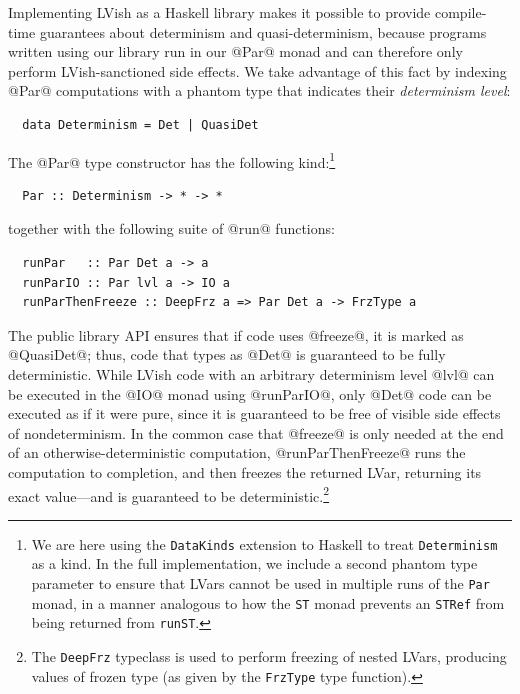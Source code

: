 Implementing LVish as a Haskell library makes it possible to provide
compile-time guarantees about determinism and quasi-determinism,
because programs written using our library run in our @Par@ monad and
can therefore only perform LVish-sanctioned side effects.
We take advantage of
this fact by indexing @Par@ computations with a phantom type
that indicates their \emph{determinism level}:
\begin{lstlisting}
  data Determinism = Det | QuasiDet
\end{lstlisting}
The @Par@ type constructor has the following kind:\footnote{We are here using
  the {\tt DataKinds} extension to Haskell to treat {\tt Determinism} as a
  kind.  In the full implementation, we include a second phantom type parameter to ensure that LVars
  cannot be used in multiple runs of the {\tt Par} monad, in a manner analogous to how the {\tt ST} monad prevents an {\tt STRef} from being returned from {\tt runST}.}
\begin{lstlisting}
  Par :: Determinism -> * -> *
\end{lstlisting}
together with the following suite of @run@ functions:
\begin{lstlisting}
  runPar   :: Par Det a -> a
  runParIO :: Par lvl a -> IO a
  runParThenFreeze :: DeepFrz a => Par Det a -> FrzType a
\end{lstlisting}
The public library API ensures that if code uses @freeze@, it is marked as
@QuasiDet@; thus, code that types as @Det@ is guaranteed to be fully
deterministic.  While LVish code with an arbitrary determinism level @lvl@ can be
executed in the @IO@ monad using @runParIO@, only @Det@ code can be executed as if it were pure,
since it is guaranteed to be free of visible side effects of nondeterminism.  In
the common case that @freeze@ is only needed at the end of an
otherwise-deterministic computation, @runParThenFreeze@ runs the computation to
completion, and then freezes the returned LVar, returning its exact value---and
is guaranteed to be deterministic.\footnote{The {\tt DeepFrz} typeclass is used
  to perform freezing of nested LVars, producing values of frozen type (as given
  by the {\tt FrzType} type function).}


